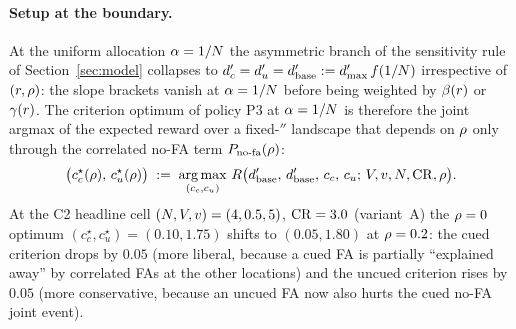 \paragraph{Setup at the boundary.}
At the uniform allocation $\alpha = 1/N$ the asymmetric branch
of the sensitivity rule of Section~\ref{sec:model} collapses to
$d'_c = d'_u = d'_{\mathrm{base}} :=
d'_{\max}\,f(1/N)$ irrespective of $(r, \rho)$: the
slope brackets vanish at $\alpha = 1/N$ before being weighted by
$\beta(r)$ or $\gamma(r)$. The criterion optimum of
policy P3 at $\alpha = 1/N$ is therefore the joint argmax of the
expected reward over a fixed-$\dprime$ landscape that depends on
$\rho$ only through the correlated no-FA term $P_{\mathrm{no\text{-}fa}}(\rho)$:
\begin{equation}
  \bigl(c_c^\star(\rho),\,c_u^\star(\rho)\bigr)
  \;:=\;
  \operatorname*{arg\,max}_{(c_c, c_u)}\,
  R\bigl(d'_{\mathrm{base}},\,d'_{\mathrm{base}},\,
           c_c,\,c_u;\,V,v,N,\mathrm{CR},\rho\bigr).
  \label{eq:c2-boundary-crit}
\end{equation}
At the C2 headline cell
$(N, V, v) = (4, 0.5, 5)$, $\mathrm{CR} = 3.0$ (variant~A) the
$\rho = 0$ optimum $(c_c^\star, c_u^\star) = (0.10, 1.75)$ shifts
to $(0.05, 1.80)$ at $\rho = 0.2$: the cued criterion drops by
$0.05$ (more liberal, because a cued FA is partially
``explained away'' by correlated FAs at the other locations) and
the uncued criterion rises by $0.05$ (more conservative, because
an uncued FA now also hurts the cued no-FA joint event).

